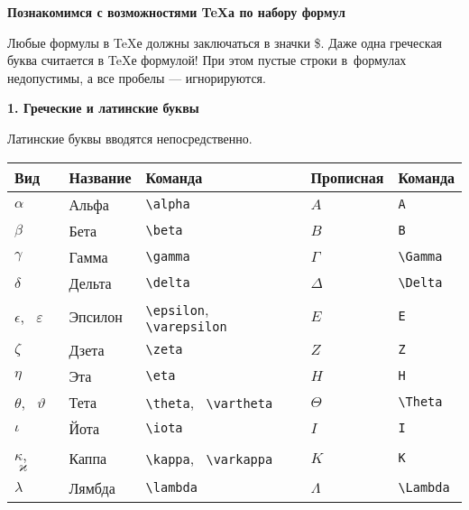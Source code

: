 \documentclass{article}
\begin{document}
\begin{center}
\textbf{Познакомимся с возможностями \TeX а по набору формул}
\end{center}


Любые формулы в \TeX е должны заключаться в значки \$. Даже одна греческая буква считается в \TeX е формулой! При этом пустые строки в~формулах недопустимы, а все пробелы --- игнорируются.

\medskip

\textbf{1. Греческие и латинские буквы}

Латинские буквы вводятся непосредственно.
\begin{center}
\begin{tabular}{|l|l|l||l|l|}\hline
\textbf{Вид}      & \textbf{Название}& \textbf{Команда}              & \textbf{Прописная}&\textbf{Команда}\\ \hline
$\alpha$                    & Альфа  & \verb"\alpha"                         & $A$       & \verb"A"       \\ \hline
$\beta$                     & Бета   & \verb"\beta"                          & $B$       & \verb"B"       \\ \hline
$\gamma$                    & Гамма  & \verb"\gamma"                         & $\Gamma$  & \verb"\Gamma"  \\ \hline
$\delta$                    & Дельта & \verb"\delta"                         & $\Delta$  & \verb"\Delta"  \\ \hline
$\epsilon$, \, $\varepsilon$& Эпсилон& \verb"\epsilon", \, \verb"\varepsilon"& $E$       & \verb"E"       \\ \hline
$\zeta$                     & Дзета  & \verb"\zeta"                          & $Z$       & \verb"Z"       \\ \hline
$\eta$                      & Эта    & \verb"\eta"                           & $H$       & \verb"H"       \\ \hline
$\theta$, \, $\vartheta$    & Тета   & \verb"\theta", \, \verb"\vartheta"    & $\Theta$  & \verb"\Theta"  \\ \hline
$\iota$                     & Йота   & \verb"\iota"                          & $I$       & \verb"I"       \\ \hline
$\kappa$, \, $\varkappa$    & Каппа  & \verb"\kappa", \, \verb"\varkappa"    & $K$       & \verb"K"       \\ \hline
$\lambda$                   & Лямбда & \verb"\lambda"                        & $\Lambda$ & \verb"\Lambda" \\ \hline

\end{tabular}
\end{center}
\end{document}
